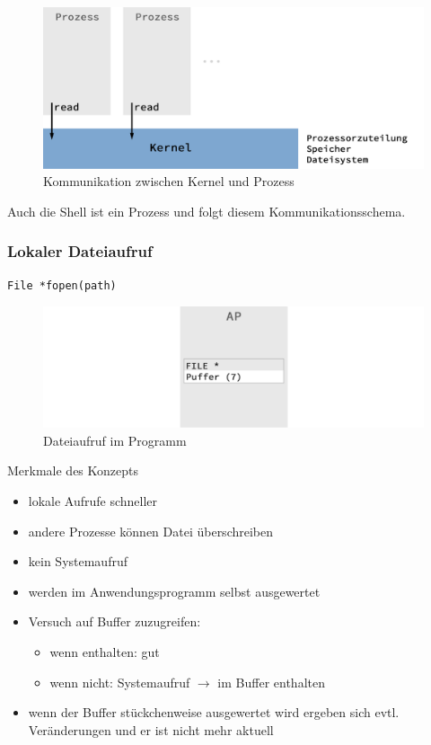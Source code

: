 	\begin{figure}[h]
		\caption{Kommunikation zwischen Kernel und Prozess}
		\includegraphics[width=\textwidth]{workfiles/v2_2}
	\end{figure}
	Auch die Shell ist ein Prozess und folgt diesem Kommunikationsschema.\\

	\subsubsection*{Lokaler Dateiaufruf} %
	\label{ssub:dateiaufrufe}
		
		\begin{lstlisting}
File *fopen(path)
		\end{lstlisting}

		\begin{figure}[h]
			\caption{Dateiaufruf im Programm}
			\includegraphics[width=\textwidth]{workfiles/v2_3}
		\end{figure}

		Merkmale des Konzepts
		\begin{itemize}
			\item lokale Aufrufe schneller
			\item andere Prozesse können Datei überschreiben
			\item kein Systemaufruf
			\item werden im Anwendungsprogramm selbst ausgewertet
			\item Versuch auf Buffer zuzugreifen:
				\begin{itemize}
					\item wenn enthalten: gut
					\item wenn nicht: Systemaufruf $\rightarrow$ im Buffer enthalten
				\end{itemize}
			\item wenn der Buffer stückchenweise ausgewertet wird ergeben sich evtl. Veränderungen und er ist nicht mehr aktuell
		\end{itemize}

